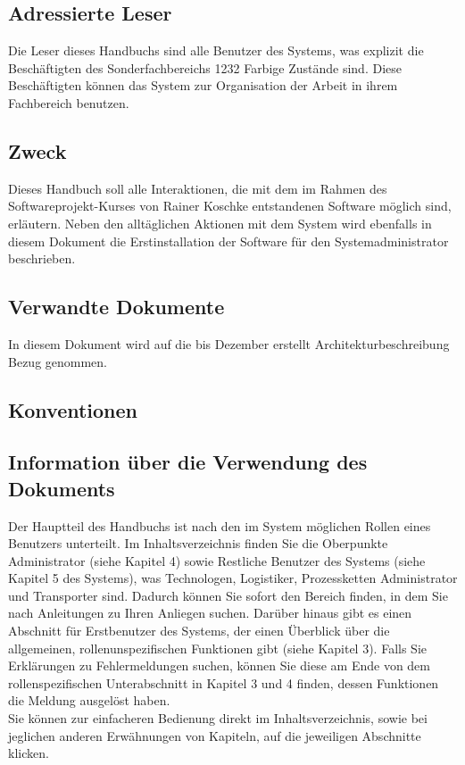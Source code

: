 \documentclass[enabledeprecatedfontcommands,fontsize=12pt,paper=a4,twoside]{scrartcl}
\begin{document}
\subsection{Adressierte Leser}
Die Leser dieses Handbuchs sind alle Benutzer des Systems, was explizit die Beschäftigten des Sonderfachbereichs 1232 Farbige Zustände sind. Diese Beschäftigten können das System zur Organisation der Arbeit in ihrem Fachbereich benutzen. \\
\subsection{Zweck}
Dieses Handbuch soll alle Interaktionen, die mit dem im Rahmen des Softwareprojekt-Kurses von Rainer Koschke entstandenen Software möglich sind, erläutern. Neben den alltäglichen Aktionen mit dem System wird ebenfalls in diesem Dokument die Erstinstallation der Software für den Systemadministrator beschrieben. \\
\subsection{Verwandte Dokumente}
In diesem Dokument wird auf die bis Dezember erstellt Architekturbeschreibung Bezug genommen. \\
\subsection{Konventionen}
\subsection{Information über die Verwendung des Dokuments}
Der Hauptteil des Handbuchs ist nach den im System möglichen Rollen eines Benutzers unterteilt. Im Inhaltsverzeichnis finden Sie die Oberpunkte Administrator (siehe Kapitel 4) sowie Restliche Benutzer des Systems (siehe Kapitel 5 des Systems), was Technologen, Logistiker, Prozessketten Administrator und Transporter sind. Dadurch können Sie sofort den Bereich finden, in dem Sie nach Anleitungen zu Ihren Anliegen suchen. Darüber hinaus gibt es einen Abschnitt für Erstbenutzer des Systems, der einen Überblick über die allgemeinen, rollenunspezifischen Funktionen gibt (siehe Kapitel 3). Falls Sie Erklärungen zu Fehlermeldungen suchen, können Sie diese am Ende von dem rollenspezifischen Unterabschnitt in Kapitel 3 und 4 finden, dessen Funktionen die Meldung ausgelöst haben. \\
Sie können zur einfacheren Bedienung direkt im Inhaltsverzeichnis, sowie bei jeglichen anderen Erwähnungen von Kapiteln, auf die jeweiligen Abschnitte klicken. \\
\end{document}
